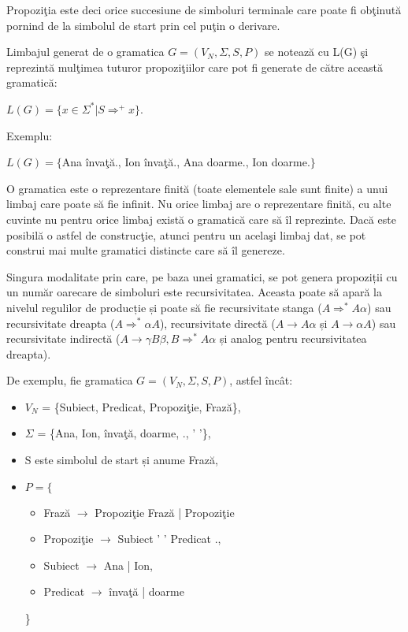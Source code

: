 Propoziţia este deci orice succesiune de simboluri terminale care poate fi obţinută pornind de la simbolul de start prin cel puţin o derivare.

\begin{definitie}
Limbajul generat de o gramatica $G = (V_{N}, \Sigma, S, P)$ se notează cu L(G) şi reprezintă mulţimea tuturor propoziţiilor care pot fi generate de către această gramatică:

$L(G) = \{ x \in \Sigma^{*} | S \Rightarrow^{+} x \}$.
\end{definitie}

Exemplu:

$L(G) = \{$Ana învaţă., Ion învaţă., Ana doarme., Ion doarme.$\}$

O gramatica este o reprezentare finită (toate elementele sale sunt finite) a unui limbaj care poate să fie infinit. Nu orice limbaj are o reprezentare finită, cu alte cuvinte nu pentru orice limbaj există o gramatică care să îl reprezinte. Dacă este posibilă o astfel de construcţie, atunci pentru un acelaşi limbaj dat, se pot construi mai multe gramatici distincte care să îl genereze.

Singura modalitate prin care, pe baza unei gramatici, se pot genera propoziții cu un număr oarecare de simboluri este recursivitatea. Aceasta poate să apară la nivelul regulilor de producție și poate să fie recursivitate stanga ($A \Rightarrow^{*} A \alpha$) sau recursivitate dreapta ($A \Rightarrow^{*} \alpha A$), recursivitate directă ($A \rightarrow A \alpha$ și $A \rightarrow \alpha A$) sau recursivitate indirectă ($A \rightarrow \gamma B \beta, B \Rightarrow^{*} A \alpha$ și analog pentru recursivitatea dreapta).

De exemplu, fie gramatica $G = (V_{N}, \Sigma, S, P)$, astfel încât:

\begin{itemize}
\item
$V_{N}$ = \{Subiect, Predicat, Propoziţie, Frază\},
\item
$\Sigma$ = \{Ana, Ion, învaţă, doarme, ., ' '\},
\item
S este simbolul de start și anume Frază,
\item
$P = \{$
\begin{itemize}
\item
Frază $\rightarrow$ Propoziţie Frază | Propoziţie
\item
Propoziţie $\rightarrow$ Subiect ' ' Predicat .,
\item
Subiect $\rightarrow$ Ana | Ion,
\item
Predicat $\rightarrow$ învaţă | doarme
\end{itemize}
\}
\end{itemize}

